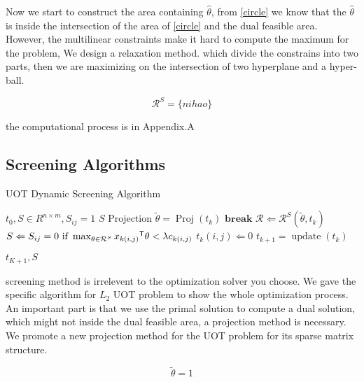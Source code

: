 Now we start to construct the area containing $\hat{\theta}$, from \ref{circle} we know that the $\hat{\theta}$ is inside the intersection of the area of \ref{circle} and the dual feasible area. However, the multilinear constraints make it hard to compute the maximum for the problem, We design a relaxation method. which divide the constrains into two parts, then we are maximizing on the intersection of two hyperplane and a hyper-ball. 

\begin{thm}\label{area}
$$
\mathcal{R}^S = \{ nihao \}
$$
\end{thm}
the computational process is in Appendix.A

\subsection{Screening Algorithms}

 \begin{algorithm}
 \caption{UOT Dynamic Screening Algorithm}
 \begin{algorithmic}[1]
 \renewcommand{\algorithmicrequire}{\textbf{Input:}}
 \renewcommand{\algorithmicensure}{\textbf{Output:}}
 \REQUIRE $t_0, S \in R^{n\times m}, S_{ij}=1$
 \ENSURE  $S$
  \STATE {}
  \STATE $\text{Projection } \tilde{\theta} = \operatorname{Proj}(t_k)$ 
  \STATE $\textbf{break}$
  \ENDIF
    \STATE $\mathcal{R} \Leftarrow \mathcal{R}^S{(\tilde{\theta},t_k)}$
    \STATE $S \Leftarrow {S_{ij} = 0 \text{ if } \max_{\theta \in \mathcal{R}^S} {x_{k(i,j)}}^{\mathsf T}\theta <\lambda c_{k(i,j)} }$
    \STATE $t_k(i,j) \Leftarrow 0$
    \ENDFOR
    \STATE $t_{k+1} = \operatorname{update}(t_k)$
  \ENDFOR
  
 \RETURN $t_{K+1}, S $ 
 \end{algorithmic} 
 \end{algorithm}

screening method is irrelevent to the optimization solver you choose. We gave the specific algorithm for $L_2$ UOT problem to show the whole optimization process.\\
An important part is that we use the primal solution to compute a dual solution, which might not inside the dual feasible area, a projection method is necessary. We promote a new projection method for the UOT problem for its sparse matrix structure.

\begin{thm}\label{proj}
$$
\tilde{\theta} = 1
$$
\end{thm}











































